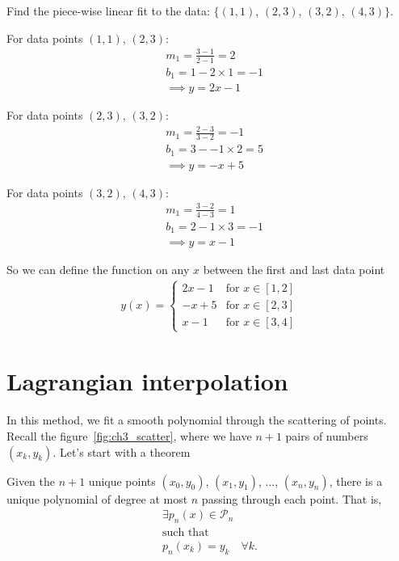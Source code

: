 \exemple{\upline}
{
	Find the piece-wise linear fit to the data: $\{ (1,1)$, $(2,3)$, $(3,2)$, $(4,3) \}$.
	
	For data points $(1,1)$, $(2,3)$:
	\begin{align*}
	& m_1 = \frac{3-1}{2-1} = 2 \\
	& b_1 = 1 - 2\times 1 = -1 \\
	& \implies y = 2x - 1
	\end{align*}
	
	For data points $(2,3)$, $(3,2)$:
	\begin{align*}
	& m_1 = \frac{2-3}{3-2} = -1 \\
	& b_1 = 3 - -1 \times 2 = 5 \\
	& \implies y = -x + 5
	\end{align*}
	
	For data points $(3,2)$, $(4,3)$:
	\begin{align*}
	& m_1 = \frac{3-2}{4-3} = 1 \\
	& b_1 = 2 - 1\times 3 = -1 \\
	& \implies y = x - 1
	\end{align*}
	
	So we can define the function on any $x$ between the first and last data point
	\begin{align*}
	y(x) = 
	\begin{cases}
	2x - 1 & \text{for } x\in [1,2] \\
	-x + 5 & \text{for } x\in [2,3] \\
	 x - 1 & \text{for } x\in [3,4] 
	\end{cases}
	\end{align*}
}{\downline}


\section{Lagrangian interpolation}
In this method, we fit a smooth polynomial through the scattering of points. Recall the figure~\ref{fig:ch3_scatter}, where we have $n+1$ pairs of numbers $(x_k,y_k)$. Let's start with a theorem

{Given the $n+1$ unique points $(x_0,y_0)$, $(x_1,y_1)$, $\dots$, $(x_n,y_n)$, there is a unique polynomial of degree at most $n$ passing through each point. That is, 
\begin{gather*}
\exists p_n(x) \in \mathcal{P}_n \\
\text{such that}\\ 
p_n(x_k)=y_k \quad \forall k.
\end{gather*}
}

